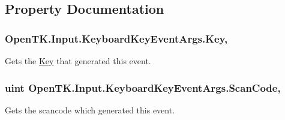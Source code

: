 \subsection{Property Documentation}
\hypertarget{class_open_t_k_1_1_input_1_1_keyboard_key_event_args_a9524843e284d227163c419260852768a}{
\subsubsection[{Key}]{ Open\-T\-K.\-Input.\-Keyboard\-Key\-Event\-Args.\-Key\hspace{0.3cm}{\ttfamily [get]}, {\ttfamily [set]}}}\label{class_open_t_k_1_1_input_1_1_keyboard_key_event_args_a9524843e284d227163c419260852768a}


Gets the \hyperlink{class_open_t_k_1_1_input_1_1_keyboard_key_event_args_a9524843e284d227163c419260852768a}{Key} that generated this event. 

\hypertarget{class_open_t_k_1_1_input_1_1_keyboard_key_event_args_a6c078617c6c29f76bc1c771ece1d9604}{
\subsubsection[{Scan\-Code}]{\setlength{\rightskip}{0pt plus 5cm}uint Open\-T\-K.\-Input.\-Keyboard\-Key\-Event\-Args.\-Scan\-Code\hspace{0.3cm}{\ttfamily [get]}, {\ttfamily [set]}}}\label{class_open_t_k_1_1_input_1_1_keyboard_key_event_args_a6c078617c6c29f76bc1c771ece1d9604}


Gets the scancode which generated this event. 

